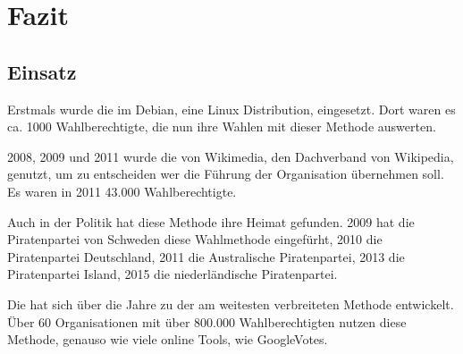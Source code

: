 \section{Fazit}
\label{sec:Fazit}



\subsection{Einsatz} 
\label{sec:einsatz}
Erstmals wurde die  im Debian, eine Linux Distribution, eingesetzt. Dort waren es ca. 1000 Wahlberechtigte, die nun ihre Wahlen mit dieser Methode auswerten. \citep{Debian2018}

2008, 2009 und 2011 wurde die \schulze von Wikimedia, den Dachverband von Wikipedia, genutzt, um zu entscheiden wer die Führung der Organisation übernehmen soll. Es waren in 2011 43.000 Wahlberechtigte. \citep{Schulze2017}

Auch in der Politik hat diese Methode ihre Heimat gefunden. 2009 hat die Piratenpartei von Schweden diese Wahlmethode eingefürht, 2010 die Piratenpartei Deutschland, 2011 die Australische Piratenpartei, 2013 die Piratenpartei Island, 2015 die niederländische Piratenpartei. \citep{Lohmann2013}

Die \schulze hat sich über die Jahre zu der am weitesten verbreiteten \condorcet Methode entwickelt. Über 60 Organisationen mit über 800.000 Wahlberechtigten nutzen diese Methode, genauso wie viele online Tools, wie GoogleVotes. \citep{Schulze2018}







